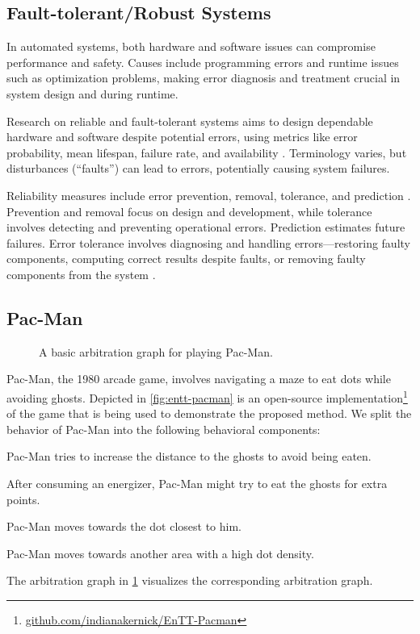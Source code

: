 \subsection{Fault-tolerant/Robust Systems}

In automated systems, both hardware and software issues can compromise performance and safety.
Causes include programming errors and runtime issues such as optimization problems, making error diagnosis and treatment crucial in system design and during runtime.

Research on reliable and fault-tolerant systems aims to design dependable hardware and software
despite potential errors, using metrics like error probability, mean lifespan, failure rate, and availability \cite{echtleFehlertoleranzverfahren1990}.
Terminology varies, but disturbances (\enquote{faults}) can lead to errors, potentially causing system failures.

Reliability measures include error prevention, removal, tolerance, and prediction \cite{dubrovaFaultTolerantDesign2013}.
Prevention and removal focus on design and development, while tolerance involves detecting and preventing operational errors.
Prediction estimates future failures.
Error tolerance involves diagnosing and handling errors—restoring faulty components,
computing correct results despite faults, or removing faulty components from the system \cite{echtleFehlertoleranzverfahren1990}.

\subsection{Pac-Man}

\begin{figure}
    \centering
    
    \caption{A basic arbitration graph for playing Pac-Man.}
    \label{fig:pacman-arbitrator-base}
\end{figure}

Pac-Man, the 1980 arcade game, involves navigating a maze to eat dots while avoiding ghosts.
Depicted in \cref{fig:entt-pacman} is an open-source implementation\footnote{\url{github.com/indianakernick/EnTT-Pacman}}
of the game that is being used to demonstrate the proposed method.
We split the behavior of Pac-Man into the following behavioral components:
\begin{description}[align=left]
    \item[Avoid Ghosts] Pac-Man tries to increase the distance to the ghosts to avoid being eaten.
    \item[Chase Ghosts] After consuming an energizer, Pac-Man might try to eat the ghosts for extra points.
    \item[Eat Closest Dot] Pac-Man moves towards the dot closest to him.
    \item[Change Dot Cluster] Pac-Man moves towards another area with a high dot density.
\end{description}

The arbitration graph in \cref{fig:pacman-arbitrator-base} visualizes the corresponding arbitration graph.

